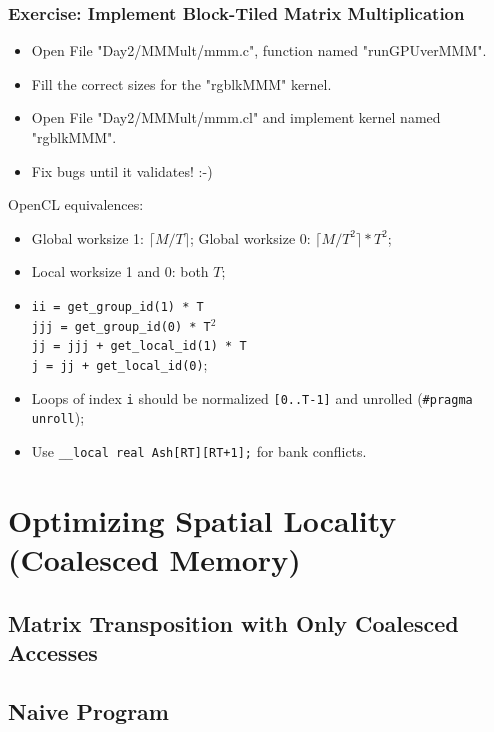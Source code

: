\documentclass{beamer}
\begin{document}
\begin{frame}[fragile,t]
  \frametitle{Exercise: Implement Block-Tiled Matrix Multiplication}

\begin{itemize}
    \item Open File "Day2/MMMult/mmm.c", function named "runGPUverMMM".
    \item Fill the correct sizes for the "rgblkMMM" kernel.
    \item Open File "Day2/MMMult/mmm.cl" and implement kernel named "rgblkMMM".
    \item Fix bugs until it validates! :-)
\end{itemize}

OpenCL equivalences: \pause
\begin{itemize}
    \item Global worksize 1: $\lceil M/T \rceil$; Global worksize 0: $\lceil M/T^2 \rceil * T^2$;
    \item Local worksize 1 and 0: both $T$;
    \item {\tt ii = get\_group\_id(1) * T}\\
          {\tt jjj = get\_group\_id(0) * T$^2$}\\
          {\tt jj = jjj + get\_local\_id(1) * T}\\
          {\tt j = jj + get\_local\_id(0)};
    \item Loops of index {\tt i} should be normalized {\tt[0..T-1]} and unrolled ({\tt \#pragma unroll});
    \item Use {\tt \_\_local real Ash[RT][RT+1];} for bank conflicts.
\end{itemize}

\end{frame}

\section{Optimizing Spatial Locality (Coalesced Memory)}

\begin{frame}[fragile]
	\tableofcontents[currentsection]
\end{frame}

\subsection{Matrix Transposition with Only Coalesced Accesses}

\subsection{Naive Program}
\end{document}

